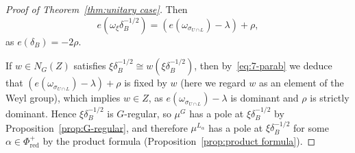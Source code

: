 \documentclass[a4paper]{amsart}
\numberwithin{equation}{section}
\theoremstyle{remark}
\theoremstyle{definition}
\begin{document}
\begin{proof}[Proof of Theorem~\ref{thm:unitary case}]
  Then
  \begin{equation}\label{eq:7-parab}
    e(\omega_{\xi}\delta_B^{-1/2}) = (e(\omega_{\sigma_{U \cap L}}) - \lambda) + \rho,
  \end{equation}
  as $e(\delta_{B}) = -2\rho$.

  If $w\in N_{G}(Z)$ satisfies $\xi \delta_B^{-1/2} \cong w(\xi \delta_B^{-1/2})$, then by~\eqref{eq:7-parab} we deduce that $(e(\omega_{\sigma_{U\cap L}}) - \lambda) + \rho$   is fixed by $w$ (here we regard $w$ as an element of the Weyl group), which implies $w \in Z$, as $e(\omega_{\sigma_{U \cap L}}) - \lambda$ is dominant and $\rho$ is strictly dominant.
  Hence $\xi \delta_B^{-1/2}$ is $G$-regular, so $\mu^{G}$ has a pole at $\xi \delta_B^{-1/2}$ by Proposition~\ref{prop:G-regular}, and therefore $\mu^{L_{\alpha}}$ has a pole at $\xi \delta_B^{-1/2}$ for some $\alpha \in \Phi_{\mathrm{red}}^+$ by the product formula (Proposition~\ref{prop:product formula}).


\end{proof}
\end{document}
